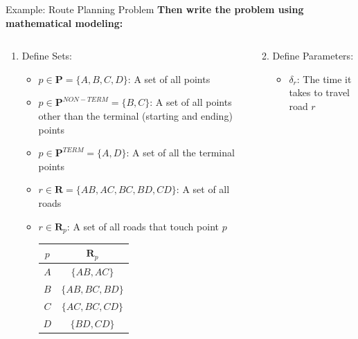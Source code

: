 \documentclass[10pt, aspectratio=169]{beamer}
\begin{document}
\begin{frame}[t]{Example: Route Planning Problem}
    \textbf{Then write the problem using mathematical modeling:}
    \begin{columns}[t]
        \begin{column}[t]{0.5\textwidth}
            \begin{enumerate}
                \item Define Sets:
                \begin{itemize}
                    \item $p \in \textbf{P} = \{A,B,C,D\}$: A set of all points
                    \item $p \in \textbf{P}^{NON-TERM} = \{B,C\}$: A set of all points other than the terminal (starting and ending) points
                    \item $p \in \textbf{P}^{TERM} = \{A,D\}$: A set of all the terminal points
                    \item $r \in \textbf{R} = \{AB,AC,BC,BD,CD\}$: A set of all roads
                    \item $r \in \textbf{R}_p$: A set of all roads that touch point $p$
                    
                    \begin{tabular}{|c|c|}
                        \hline
                        $p$ & $\textbf{R}_p$ \\
                        \hline \hline
                        $A$ & $\{AB,AC\}$\\
                        \hline
                        $B$ & $\{AB,BC,BD\}$\\
                        \hline
                        $C$ & $\{AC,BC,CD\}$\\
                        \hline
                        $D$ & $\{BD,CD\}$\\
                        \hline
                    \end{tabular}
                \end{itemize}
            \end{enumerate}
        \end{column}
        \begin{column}[t]{0.5\textwidth}
            \begin{enumerate}
                \setcounter{enumi}{1}
                \item Define Parameters:
                \begin{itemize}
                    \item $\delta_r$: The time it takes to travel road $r$
                    

\end{itemize}
\end{enumerate}
\end{column}
\end{columns}
\end{frame}
\end{document}

